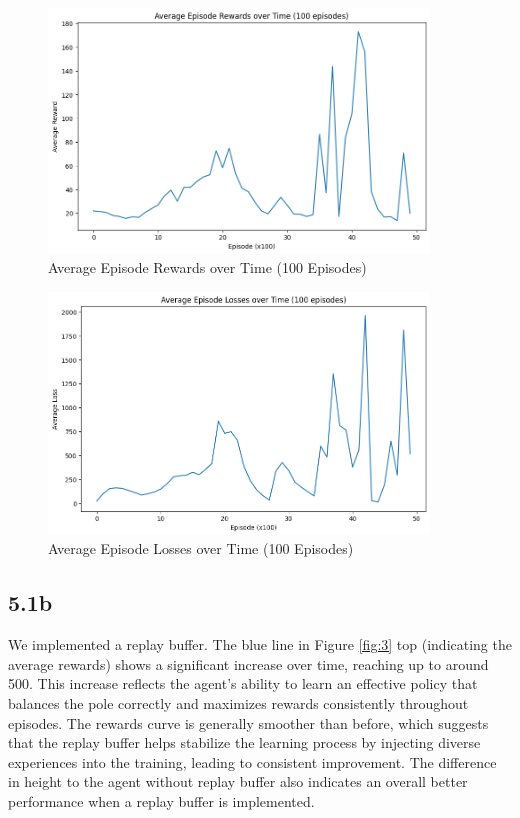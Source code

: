 \documentclass{article} %
\begin{document}
	\begin{figure}[h!]
		\centering
		\includegraphics[width=0.9\textwidth]{images/1a_1.png}
		\caption{Average Episode Rewards over Time (100 Episodes)}
		\label{fig:1}
	\end{figure}
	
	\begin{figure}[h!]
		\centering
		\includegraphics[width=0.9\textwidth]{images/1a_2.png}
		\caption{Average Episode Losses over Time (100 Episodes)}
		\label{fig:2}
	\end{figure}
	
	\newpage
	
	\subsection{5.1b}
	We implemented a replay buffer. The blue line in Figure \ref{fig:3} top (indicating the average rewards) shows a significant increase over time, reaching up to around 500. This increase reflects the agent's ability to learn an effective policy that balances the pole correctly and maximizes rewards consistently throughout episodes.
	The rewards curve is generally smoother than before, which suggests that the replay buffer helps stabilize the learning process by injecting diverse experiences into the training, leading to consistent improvement. The difference in height to the agent without replay buffer also indicates an overall better performance when a replay buffer is implemented.
	
\end{document}
